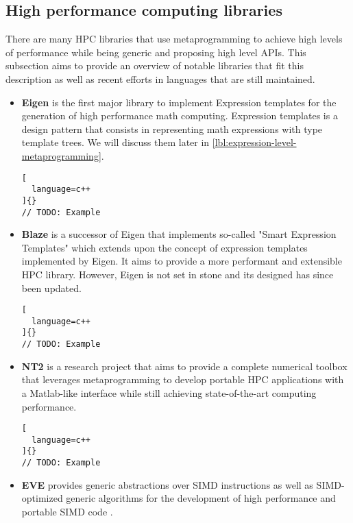 \documentclass[../main]{subfiles}
\begin{document}
\subsection{High performance computing libraries}

There are many \cpp HPC libraries that use metaprogramming to achieve
high levels of performance while being generic and proposing high level APIs.
This subsection aims to provide an overview of notable libraries that fit this
description as well as recent efforts in languages that are still maintained.

\begin{itemize}

\item
\textbf{Eigen} \cite{eigen} is the first major \cpp library to implement
Expression templates for the generation of high performance math computing.
Expression templates is a \cpp design pattern that consists in representing
math expressions with type template trees. We will discuss them later in
\ref{lbl:expression-level-metaprogramming}.

\begin{lstlisting}[
  language=c++
]{}
// TODO: Example
\end{lstlisting}

\item
\textbf{Blaze} \cite{blazelib} is a successor of Eigen that implements so-called
"Smart Expression Templates" which extends upon the concept of
expression templates implemented by Eigen. It aims to provide a more performant
and extensible HPC library. However, Eigen is not set in stone
and its designed has since been updated.

\begin{lstlisting}[
  language=c++
]{}
// TODO: Example
\end{lstlisting}

\item
\textbf{NT2} \cite{nt2} is a research project that aims to provide a complete
numerical toolbox that leverages metaprogramming to develop portable HPC
applications with a Matlab-like interface while still achieving state-of-the-art
computing performance.

\begin{lstlisting}[
  language=c++
]{}
// TODO: Example
\end{lstlisting}

\item
\textbf{EVE} \cite{eve} provides generic abstractions over SIMD instructions
as well as SIMD-optimized generic algorithms for the development of
high performance and portable SIMD code \cite{hpcs2018-matvec}.


\end{itemize}
\end{document}
